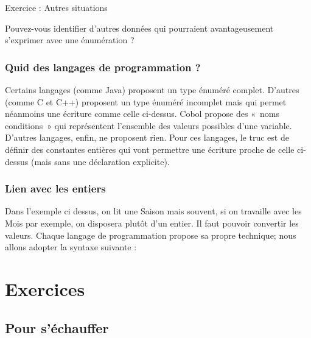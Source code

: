 			\begin{Emphase}[exercice]{Exercice : Autres situations}

				Pouvez-vous identifier d'autres données qui pourraient
				avantageusement s'exprimer avec une énumération ?

			\end{Emphase}
			
			\subsubsection*{Quid des langages de programmation ?}

				Certains langages (comme Java) proposent un type énuméré complet.
				D'autres (comme C et C++) proposent un type énuméré
				incomplet mais qui permet néanmoins une écriture comme celle ci-dessus.
				Cobol propose des «~noms conditions~» qui représentent
				l'ensemble des valeurs possibles
				d'une variable. D'autres langages,
				enfin, ne proposent rien. Pour ces langages, le truc est de définir des
				constantes entières qui vont permettre une écriture proche de celle
				ci-dessus (mais sans une déclaration explicite).

			\subsubsection*{Lien avec les entiers}

				Dans l'exemple ci dessus, on lit une Saison mais souvent,
				si on travaille avec les Mois par exemple,
				on disposera plutôt d'un entier. Il faut pouvoir
				convertir les valeurs. Chaque langage de programmation propose sa
				propre technique; nous allons adopter la syntaxe suivante :


	\section{Exercices}

		\subsection{Pour s'échauffer}

